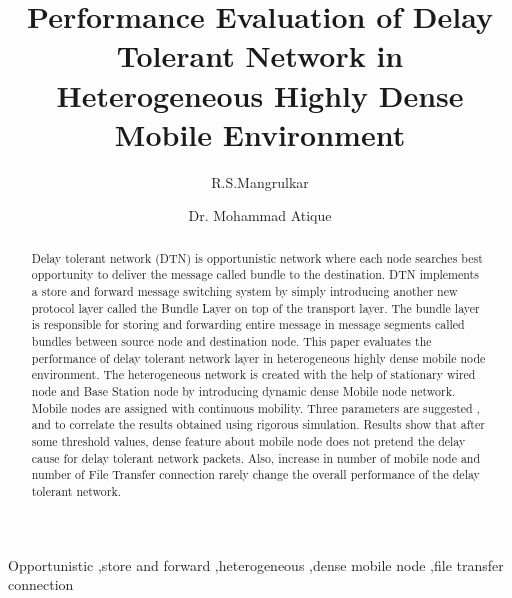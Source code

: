 \documentclass[3p,times]{elsarticle}
\begin{document}
\begin{frontmatter}





\dochead{}


\title{
Performance Evaluation of Delay Tolerant Network in Heterogeneous Highly Dense Mobile Environment 
}
\author[label1]{R.S.Mangrulkar}
\author[label2]{Dr. Mohammad Atique}






\begin{abstract}
Delay tolerant network (DTN) is opportunistic network where each node searches best opportunity to deliver the message called bundle to the destination. DTN implements a store and forward message switching system by simply introducing another new protocol layer called the Bundle Layer on top of the transport layer. The bundle layer is responsible for storing and forwarding entire message in message segments called bundles between source node and destination node. This paper evaluates the performance of delay tolerant network layer in heterogeneous highly dense mobile node environment. The heterogeneous network is created with the help of stationary wired node and Base Station node by introducing dynamic dense Mobile node network. Mobile nodes are assigned with continuous mobility. Three parameters are suggested ,  and  to correlate the results obtained using rigorous simulation. Results show that after some threshold values, dense feature about mobile node does not pretend the delay cause for delay tolerant network packets. Also, increase in number of mobile node and number of File Transfer connection rarely change the overall performance of the delay tolerant network.
\end{abstract}

\begin{keyword}
Opportunistic \sep store and forward \sep heterogeneous \sep dense mobile node \sep file transfer connection




\end{keyword}

\end{frontmatter}
\end{document}
